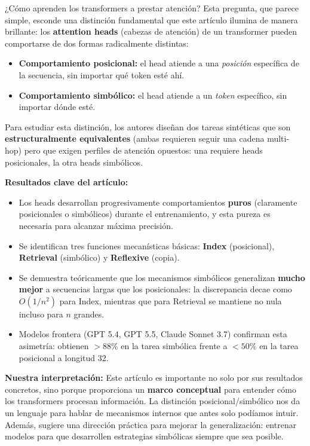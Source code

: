 \documentclass[12pt,a4paper,oneside]{report}
\begin{document}
¿Cómo aprenden los transformers a prestar atención? Esta pregunta, que parece simple, esconde una distinción fundamental que este artículo ilumina de manera brillante: los \textbf{attention heads} (cabezas de atención) de un transformer pueden comportarse de dos formas radicalmente distintas:

\begin{itemize}
    \item \textbf{Comportamiento posicional:} el head atiende a una \emph{posición} específica de la secuencia, sin importar qué token esté ahí.
    \item \textbf{Comportamiento simbólico:} el head atiende a un \emph{token} específico, sin importar dónde esté.
\end{itemize}

Para estudiar esta distinción, los autores diseñan dos tareas sintéticas que son \textbf{estructuralmente equivalentes} (ambas requieren seguir una cadena multi-hop) pero que exigen perfiles de atención opuestos: una requiere heads posicionales, la otra heads simbólicos.

\vspace{6pt}
\textbf{Resultados clave del artículo:}
\begin{itemize}
    \item Los heads desarrollan progresivamente comportamientos \textbf{puros} (claramente posicionales o simbólicos) durante el entrenamiento, y esta pureza es necesaria para alcanzar máxima precisión.
    \item Se identifican tres funciones mecanísticas básicas: \textbf{Index} (posicional), \textbf{Retrieval} (simbólico) y \textbf{Reflexive} (copia).
    \item Se demuestra teóricamente que los mecanismos simbólicos generalizan \textbf{mucho mejor} a secuencias largas que los posicionales: la discrepancia decae como $O(1/n^2)$ para Index, mientras que para Retrieval se mantiene no nula incluso para $n$ grandes.
    \item Modelos frontera (GPT 5.4, GPT 5.5, Claude Sonnet 3.7) confirman esta asimetría: obtienen $>88\%$ en la tarea simbólica frente a $<50\%$ en la tarea posicional a longitud 32.
\end{itemize}

\vspace{6pt}
\textbf{Nuestra interpretación:} Este artículo es importante no solo por sus resultados concretos, sino porque proporciona un \textbf{marco conceptual} para entender cómo los transformers procesan información. La distinción posicional/simbólico nos da un lenguaje para hablar de mecanismos internos que antes solo podíamos intuir. Además, sugiere una dirección práctica para mejorar la generalización: entrenar modelos para que desarrollen estrategias simbólicas siempre que sea posible.
\end{document}
